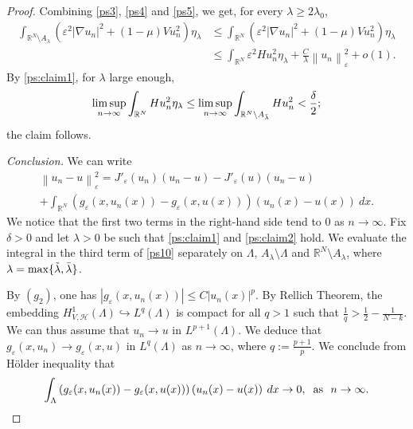 \documentclass[a4paper]{amsart}
\begin{document}
\begin{proof}
Combining \eqref{ps3}, \eqref{ps4} and \eqref{ps5}, we get, for every $\lambda \geq 2\lambda_0$, 
\[
\begin{split}
  \int_{{\mathbb{R}}^N\setminus A_{\lambda}} \left( \varepsilon^2 {\left| {\nabla u_n} \right|}^2 + (1-\mu) V u_n^2 \right)\eta_{\lambda}
&\leq
  \int_{{\mathbb{R}}^N} \left( \varepsilon^2 {\left| {\nabla u_n} \right|}^2 + (1-\mu) V u_n^2 \right)\eta_{\lambda} \\
&\leq \int_{{\mathbb{R}}^N} \varepsilon^2 H
u_n^2 \eta_{\lambda} + \frac{C}{\lambda} {\left\| {u_n} \right\|}_{\varepsilon}^2 + o(1).
\end{split}
 \]
By \eqref{ps:claim1}, for $\lambda$ large enough,
\begin{align*}
 \limsup_{n \rightarrow \infty} \int_{{\mathbb{R}}^N} H u_n^2 \eta_{\lambda} \leq \limsup_{n \rightarrow \infty}
\int_{{\mathbb{R}}^N\setminus A_{\Bar{\lambda}}} H u_n^2 < \frac{\delta}{2};
\end{align*}
the claim follows.

\medbreak \textit{Conclusion.} We can write
\begin{multline}\label{ps10}
 {\left\| {u_n - u} \right\|}_{\varepsilon}^2 = J'_{\varepsilon}(u_n)(u_n-u) - J'_{\varepsilon}(u)(u_n-u)  \\
+ \int_{{\mathbb{R}}^N} \left(
g_{\varepsilon}(x,u_n(x))-g_{\varepsilon}(x,u(x)) \right) \left(u_n(x)-u(x)\right)\: dx.
\end{multline}
We notice that the first two terms in the right-hand side tend to $0$ as $n \rightarrow \infty$. Fix $\delta > 0$ and
let $\lambda > 0$ be such that \eqref{ps:claim1} and \eqref{ps:claim2} hold. We evaluate the integral in the third
term of \eqref{ps10} separately on $\Lambda$, $A_{\lambda}\setminus \Lambda$ and ${\mathbb{R}}^N\setminus A_{\lambda}$, where
$\lambda =\max\{\Tilde{\lambda}, \Bar{\lambda}\}$.

By $(g_2)$, one has ${\left| {g_{\varepsilon}(x,u_n(x))} \right|} \leq C {\left| {u_n(x)} \right|}^p$. By Rellich Theorem, the embedding
$H^1_{V,\mathcal{H}}(\Lambda) \hookrightarrow L^q(\Lambda)$ is compact for all $q>1$ such that 
$\frac{1}{q} > \frac{1}{2} - \frac{1}{N-k}$. We can thus assume that $u_n \rightarrow u$ in $L^{p+1}(\Lambda)$. We
deduce that $g_{\varepsilon}(x,u_n) \rightarrow g_{\varepsilon}(x,u)$ in $L^q(\Lambda)$ as $n\to \infty$, where $q :=
\frac{p+1}{p}$. We conclude from H\"older inequality that
\begin{align*}
 \int_{\Lambda} \left( g_{\varepsilon}(x,u_n(x))-g_{\varepsilon}(x,u(x)) \right) \left(u_n(x)-u(x)\right)\: dx \rightarrow 0,
\hspace{0.2cm} \text{as} \ \ n \rightarrow \infty.
\end{align*}


\end{proof}
\end{document}
